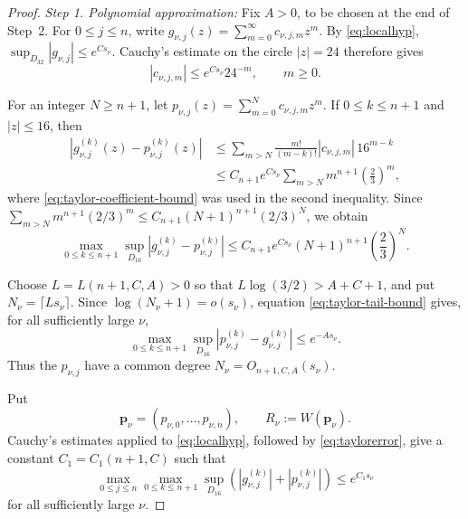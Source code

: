 \documentclass[12pt,letterpaper,reqno]{amsart}
\theoremstyle{definition}
\numberwithin{equation}{section}
\newcommand{\pv}{\bm p}
\begin{document}
\begin{proof}

\medskip\noindent
\emph{{Step 1. Polynomial approximation:}}
Fix \(A>0\), to be chosen at the end of Step~2. For
\(0\leq j\leq n\), write
\(g_{\nu,j}(z)=\sum_{m=0}^{\infty}c_{\nu,j,m}z^m\).
By \eqref{eq:localhyp},
\(\sup_{D_{32}}|g_{\nu,j}|\leq e^{Cs_\nu}\).
Cauchy's estimate on the circle \(|z|=24\) therefore gives
\begin{equation}\label{eq:taylor-coefficient-bound}
 |c_{\nu,j,m}|
 \leq
 e^{Cs_\nu}24^{-m},
 \qquad m\geq0.
\end{equation}

For an integer \(N\geq n+1\), let
\(p_{\nu,j}(z)=\sum_{m=0}^{N}c_{\nu,j,m}z^m\).
If \(0\leq k\leq n+1\) and \(|z|\leq16\), then
\[
\begin{aligned}
 |g_{\nu,j}^{(k)}(z)-p_{\nu,j}^{(k)}(z)|
 &\leq
 \sum_{m>N}
 \frac{m!}{(m-k)!}|c_{\nu,j,m}|\,16^{m-k}  \\
 &\leq
 C_{n+1} e^{Cs_\nu}
 \sum_{m>N}m^{n+1}\left(\frac23\right)^m,
\end{aligned}
\]
where \eqref{eq:taylor-coefficient-bound} was used in the second
inequality. Since
\(\sum_{m>N}m^{n+1}(2/3)^m
 \leq C_{n+1}(N+1)^{n+1}(2/3)^N\),
we obtain
\begin{equation}\label{eq:taylor-tail-bound}
 \max_{0\leq k\leq n+1}
 \sup_{D_{16}}
 |g_{\nu,j}^{(k)}-p_{\nu,j}^{(k)}|
 \leq
 C_{n+1} e^{Cs_\nu}(N+1)^{n+1}
 \left(\frac23\right)^N.
\end{equation}

Choose \(L=L({n+1},C,A)>0\) so that
\(L\log(3/2)>A+C+1\), and put
\(N_\nu=\lceil Ls_\nu\rceil\).
Since \(\log(N_\nu+1)=o(s_\nu)\), equation
\eqref{eq:taylor-tail-bound} gives, for all sufficiently large \(\nu\),
\begin{equation}\label{eq:taylorerror}
 \max_{0\leq k\leq n+1}
 \sup_{D_{16}}
 |p_{\nu,j}^{(k)}-g_{\nu,j}^{(k)}|
 \leq e^{-As_\nu}.
\end{equation}
Thus the \(p_{\nu,j}\) have a common degree
\(N_\nu=O_{n+1,C,A}(s_\nu)\).

Put
\[
 \pv_\nu=(p_{\nu,0},\ldots,p_{\nu,n}),
 \qquad
 R_\nu:=W(\pv_\nu).
\]
Cauchy's estimates applied to \eqref{eq:localhyp}, followed by
\eqref{eq:taylorerror}, give a constant \(C_1=C_1({n+1},C)\) such that
\begin{equation}\label{eq:derivative-growth}
 \max_{0\leq j\leq n}
 \max_{0\leq k\leq n+1}
 \sup_{D_{16}}
 \left(
 |g_{\nu,j}^{(k)}|
 +
 |p_{\nu,j}^{(k)}|
 \right)
 \leq e^{C_1s_\nu}
\end{equation}
for all sufficiently large \(\nu\).


\end{proof}
\end{document}
